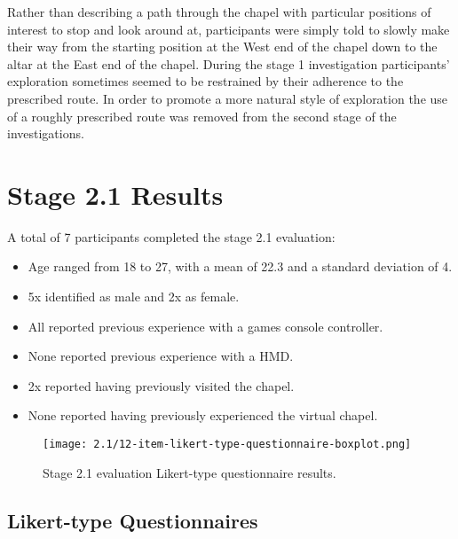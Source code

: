 Rather than describing a path through the chapel with particular positions of interest to stop and look around at, participants were simply told to slowly make their way from the starting position at the West end of the chapel down to the altar at the East end of the chapel. During the stage 1 investigation participants' exploration sometimes seemed to be restrained by their adherence to the prescribed route. In order to promote a more natural style of exploration the use of a roughly prescribed route was removed from the second stage of the investigations.


\section{Stage 2.1 Results}

A total of 7 participants completed the stage 2.1 evaluation:
\begin{itemize}
	\item Age ranged from 18 to 27, with a mean of 22.3 and a standard deviation of 4.
	\item 5x identified as male and 2x as female.
	\item All reported previous experience with a games console controller.
	\item None reported previous experience with a HMD.
	\item 2x reported having previously visited the chapel.
	\item None reported having previously experienced the virtual chapel.
\end{itemize}


\begin{figure}[h]
	\begin{center}
	\texttt{[image: 2.1/12-item-likert-type-questionnaire-boxplot.png]}
	\caption{Stage 2.1 evaluation Likert-type questionnaire results.}
	\label{2-1-12-item-likert-type-questionnaire-boxplot.png}
	\end{center}
\end{figure}


\subsection{Likert-type Questionnaires}

